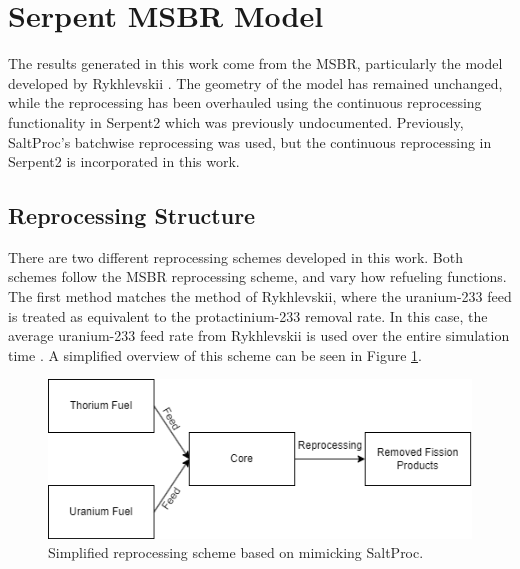 







\section{Serpent MSBR Model}

The results generated in this work come from the MSBR, particularly the model developed by Rykhlevskii \cite{rykhlevskii_advanced_2018}. The geometry of the model has remained unchanged, while the reprocessing has been overhauled using the continuous reprocessing functionality in Serpent2 which was previously undocumented. Previously, SaltProc's batchwise reprocessing was used, but the continuous reprocessing in Serpent2 is incorporated in this work.

\subsection{Reprocessing Structure}

There are two different reprocessing schemes developed in this work. Both schemes follow the MSBR reprocessing scheme, and vary how refueling functions. The first method matches the method of Rykhlevskii, where the uranium-233 feed is treated as equivalent to the protactinium-233 removal rate. In this case, the average uranium-233 feed rate from Rykhlevskii is used over the entire simulation time \cite{rykhlevskii_advanced_2018}. A simplified overview of this scheme can be seen in Figure \ref{fig:spmatchrepr}.


\begin{figure}[H]
  \centering
  \includegraphics[scale=0.7]{images/sp-match-repr-scheme.png}
  \caption{Simplified reprocessing scheme based on mimicking SaltProc.}
   \label{fig:spmatchrepr}
\end{figure}

